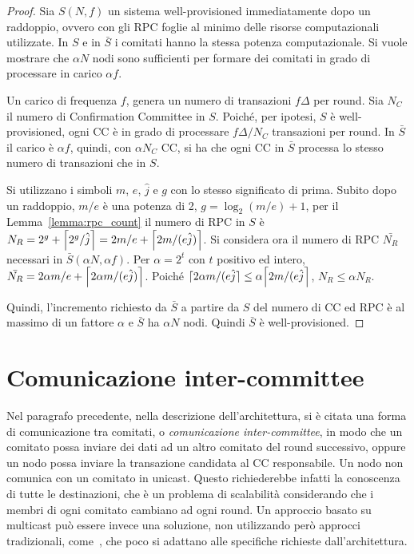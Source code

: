 \begin{proof}
Sia $S(N, f)$ un sistema well-provisioned immediatamente dopo un raddoppio, ovvero con gli RPC foglie al minimo delle risorse computazionali utilizzate. In $S$ e in $\bar{S}$ i comitati hanno la stessa potenza computazionale. Si vuole mostrare che $\alpha N$ nodi sono sufficienti per formare dei comitati in grado di processare in carico $\alpha f$.

Un carico di frequenza $f$, genera un numero di transazioni $f \Delta$ per round. Sia $N_C$ il numero di Confirmation Committee in $S$. Poiché, per ipotesi, $S$ è well-provisioned, ogni CC è in grado di processare $f \Delta / N_C$ transazioni per round. In $\bar{S}$ il carico è $\alpha f$, quindi, con $\alpha N_C$ CC, si ha che ogni CC in $\bar{S}$ processa lo stesso numero di transazioni che in $S$.

Si utilizzano i simboli $m$, $e$, $\hat{j}$ e $g$ con lo stesso significato di prima.
Subito dopo un raddoppio, $m/e$ è una potenza di 2, $g= \log_2 (m/e) +1$, per il Lemma~\ref{lemma:rpc_count} il numero di RPC in $S$ è $N_R = 2^g + \ceil*{2^g/\hat{j}} = 2m/e + \ceil*{2 m/ (e \hat{j})}$. Si considera ora il numero di RPC $\bar{N_R}$ necessari in $\bar{S}(\alpha N, \alpha f)$. Per $\alpha = 2^t$ con $t$ positivo ed intero, $\bar{N_R} = 2 \alpha m / e + \ceil*{2 \alpha m / (e \hat{j})}$. Poiché $\ceil{2 \alpha m/(e \hat{j}} \leq \alpha \ceil*{2 m / (e \hat{j}}$, $N_R \leq \alpha N_R$.

Quindi, l'incremento richiesto da $\bar{S}$ a partire da $S$ del numero di CC ed RPC è al massimo di un fattore $\alpha$ e $\bar{S}$ ha $\alpha N$ nodi. Quindi $\bar{S}$ è well-provisioned.
\end{proof}


\section{Comunicazione inter-committee}

Nel paragrafo precedente, nella descrizione dell'architettura, si è citata una forma di comunicazione tra comitati, o \emph{comunicazione inter-committee}, in modo che un comitato possa inviare dei dati ad un altro comitato del round successivo, oppure un nodo possa inviare la transazione candidata al CC responsabile.
Un nodo non comunica con un comitato in unicast. Questo richiederebbe infatti la conoscenza di tutte le destinazioni, che è un problema di scalabilità considerando che i membri di ogni comitato cambiano ad ogni round. Un approccio basato su multicast può essere invece una soluzione, non utilizzando però approcci tradizionali, come~\cite{fenner2016protocol}, che poco si adattano alle specifiche richieste dall'architettura.


